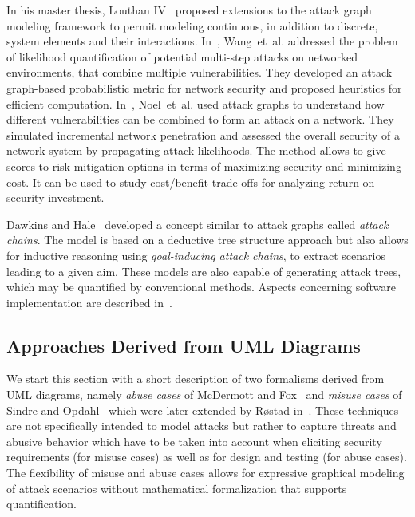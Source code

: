 \documentclass[a4paper]{article}
\begin{document}
In his master thesis, Louthan IV~\cite{Lout} proposed extensions to the attack 
graph modeling framework to permit modeling continuous, in addition to 
discrete, system elements and their interactions. In~\cite{WaIsLoSiJa},
Wang~et~al. addressed the problem of likelihood  quantification of potential
multi-step attacks on networked environments, that  combine multiple
vulnerabilities. They developed an attack graph-based  probabilistic metric for
network security and proposed heuristics for efficient  computation.
In~\cite{NoJaWaSi}, Noel~et~al. used attack graphs to understand  how different
vulnerabilities can be combined to form an attack on a network.  They simulated
incremental network penetration and assessed the overall  security of a network
system by propagating attack likelihoods. The method  allows to give scores to
risk mitigation options in terms of  maximizing security and minimizing cost. It
can be used to study cost/benefit  trade-offs for analyzing return on security
investment. 

Dawkins and Hale~\cite{DaHa} developed a concept similar to attack graphs called
\emph{attack chains}. The model is based on a deductive tree 
structure approach but also allows for inductive reasoning using 
\emph{goal-inducing attack chains}, to extract scenarios leading to a given 
aim. These models are also capable of generating attack trees, which may be 
quantified by conventional methods. Aspects concerning software implementation 
are described in~\cite{ClTyDaHa}.

\subsection{Approaches Derived from UML Diagrams}

We start this section with a short description of two formalisms derived from 
UML diagrams, namely \emph{abuse cases} of McDermott and Fox~\cite{DeFo} and 
\emph{misuse cases} of Sindre and 
Opdahl~\cite{SiOpLo2,SiOpLo,SiOpLoBr,Alex,SiOp} which were later extended by 
R\o{}stad in~\cite{Rost}. These techniques are not specifically intended to
model attacks but rather to  capture threats and abusive behavior which have to
be taken into account when  eliciting security requirements (for misuse cases)
as well as for design and  testing (for abuse cases).  The flexibility of misuse
and abuse cases allows for expressive graphical  modeling of attack scenarios
without mathematical formalization that supports  quantification.
\end{document}
